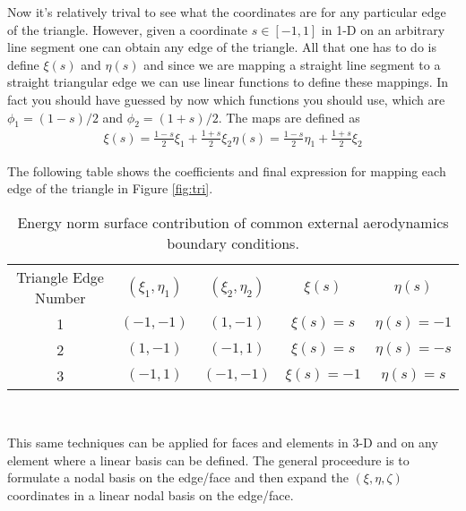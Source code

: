 \documentclass[letterpaper]{article}
\newcommand{\figref}[1]{Figure \ref{#1}}                %
\begin{document}
Now it's relatively trival to see what the coordinates are for any particular edge of the triangle.  However, given a coordinate $s\in[-1,1]$ in 1-D on an arbitrary line segment one can obtain any edge of the triangle.  All that one has to do is define $\xi(s)$ and $\eta(s)$ and since we are mapping a straight line segment to a straight triangular edge we can use linear functions to define these mappings.  In fact you should have guessed by now which functions you should use, which are $\phi_{1}=(1-s)/2$ and $\phi_{2}=(1+s)/2$.  The maps are defined as 
\begin{equation}
\begin{split}
\xi(s) = \frac{1-s}{2}\xi_{1} + \frac{1+s}{2}\xi_{2}
\eta(s) = \frac{1-s}{2}\eta_{1} + \frac{1+s}{2}\xi_{2}
\end{split}
\end{equation}

The following table shows the coefficients and final expression for mapping each edge of the triangle in \figref{fig:tri}. 

\begin{table}[h!]
\centering
\caption{Energy norm surface contribution of common external aerodynamics boundary conditions.}
\begin{tabular}{| c | c | c | c | c |}
\hline
Triangle Edge Number & $(\xi_{1},\eta_{1})$ & $(\xi_{2},\eta_{2})$ & $\xi(s)$ & $\eta(s)$ \\
1 & $(-1,-1)$ & $(1,-1)$ & $\xi(s) = s$ & $\eta(s) = -1$ \\
2 & $(1,-1)$  & $(-1, 1)$ & $\xi(s) = s$ & $\eta(s) = -s$ \\ 
3 & $(-1,1)$  & $(-1,-1)$ & $\xi(s) = -1$ & $\eta(s) = s$ \\ 
\hline
\end{tabular}\\
\label{tbl:}
\end{table}
This same techniques can be applied for faces and elements in 3-D and on any element where a linear basis can be defined.  The general proceedure is to formulate a nodal basis on the edge/face and then expand the $(\xi, \eta, \zeta)$ coordinates in a linear nodal basis on the edge/face.   

\end{document}
